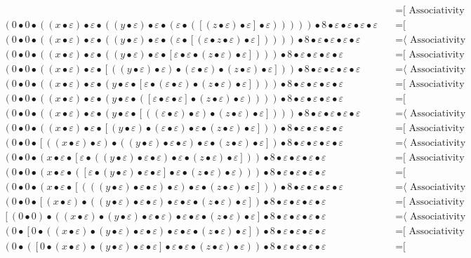 \documentclass{article}
\begin{document}
\begin{align*}
  & \quad \text{=[ Associativity ⟩}\\
(0 • 0 • ((x • ε) • ε • ((y • ε) • ε • (ε • ([(z • ε) • ε] • ε))))) • 8 • ε • ε • ε • ε
  & \quad \text{=[ Commutativity ⟩}\\
(0 • 0 • ((x • ε) • ε • ((y • ε) • ε • (ε • [(ε • z • ε) • ε])))) • 8 • ε • ε • ε • ε
  & \quad \text{=⟨ Associativity ]}\\
(0 • 0 • ((x • ε) • ε • ((y • ε) • ε • [ε • ε • (z • ε) • ε]))) • 8 • ε • ε • ε • ε
  & \quad \text{=[ Associativity ⟩}\\
(0 • 0 • ((x • ε) • ε • [((y • ε) • ε) • (ε • ε) • (z • ε) • ε])) • 8 • ε • ε • ε • ε
  & \quad \text{=⟨ Associativity ]}\\
(0 • 0 • ((x • ε) • ε • (y • ε • [ε • (ε • ε) • (z • ε) • ε]))) • 8 • ε • ε • ε • ε
  & \quad \text{=[ Associativity ⟩}\\
(0 • 0 • ((x • ε) • ε • (y • ε • ([ε • ε • ε] • (z • ε) • ε)))) • 8 • ε • ε • ε • ε
  & \quad \text{=[ Commutativity ⟩}\\
(0 • 0 • ((x • ε) • ε • (y • ε • [((ε • ε) • ε) • (z • ε) • ε]))) • 8 • ε • ε • ε • ε
  & \quad \text{=⟨ Associativity ]}\\
(0 • 0 • ((x • ε) • ε • [(y • ε) • (ε • ε) • ε • (z • ε) • ε])) • 8 • ε • ε • ε • ε
  & \quad \text{=[ Associativity ⟩}\\
(0 • 0 • [((x • ε) • ε) • ((y • ε) • ε • ε) • ε • (z • ε) • ε]) • 8 • ε • ε • ε • ε
  & \quad \text{=⟨ Associativity ]}\\
(0 • 0 • (x • ε • [ε • ((y • ε) • ε • ε) • ε • (z • ε) • ε])) • 8 • ε • ε • ε • ε
  & \quad \text{=[ Associativity ⟩}\\
(0 • 0 • (x • ε • ([ε • (y • ε) • ε • ε] • ε • (z • ε) • ε))) • 8 • ε • ε • ε • ε
  & \quad \text{=[ Commutativity ⟩}\\
(0 • 0 • (x • ε • [(((y • ε) • ε • ε) • ε) • ε • (z • ε) • ε])) • 8 • ε • ε • ε • ε
  & \quad \text{=⟨ Associativity ]}\\
(0 • 0 • [(x • ε) • ((y • ε) • ε • ε) • ε • ε • (z • ε) • ε]) • 8 • ε • ε • ε • ε
  & \quad \text{=[ Associativity ⟩}\\
[(0 • 0) • ((x • ε) • (y • ε) • ε • ε) • ε • ε • (z • ε) • ε] • 8 • ε • ε • ε • ε
  & \quad \text{=⟨ Associativity ]}\\
(0 • [0 • ((x • ε) • (y • ε) • ε • ε) • ε • ε • (z • ε) • ε]) • 8 • ε • ε • ε • ε
  & \quad \text{=[ Associativity ⟩}\\
(0 • ([0 • (x • ε) • (y • ε) • ε • ε] • ε • ε • (z • ε) • ε)) • 8 • ε • ε • ε • ε
  & \quad \text{=[ Commutativity ⟩}\\

\end{align*}
\end{document}
